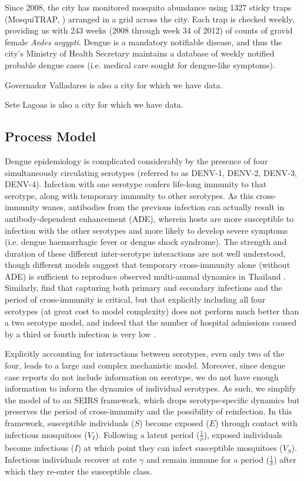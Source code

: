 \documentclass[10pt,letterpaper]{article}
\begin{document}
Since 2008, the city has monitored mosquito abundance using 1327 sticky traps (MosquiTRAP, \cite{Eiras2009}) arranged in a grid across the city.
Each trap is checked weekly, providing us with 243 weeks (2008 through week 34 of 2012) of counts of gravid female \emph{Aedes aegypti}.
Dengue is a mandatory notifiable disease, and thus the city's Ministry of Health Secretary maintains a database of weekly notified probable dengue cases (i.e. medical care sought for dengue-like symptoms).

Governador Valladares is also a city for which we have data.

Sete Lagoas is also a city for which we have data.


\subsection*{Process Model}

Dengue epidemiology is complicated considerably by the presence of four simultaneously circulating serotypes (referred to as DENV-1, DENV-2, DENV-3, DENV-4).
Infection with one serotype confers life-long immunity to that serotype, along with temporary immunity to other serotypes.  
As this cross-immunity wanes, antibodies from the previous infection can actually result in antibody-dependent enhancement (ADE), wherein hosts are more susceptible to infection with the other serotypes and more likely to develop severe symptoms (i.e. dengue haemorrhagic fever or dengue shock syndrome).
The strength and duration of these different inter-serotype interactions are not well understood, though different models suggest that temporary cross-immunity alone (without ADE) is sufficient to reproduce observed multi-annual dynamics in Thailand \cite{Wearing2006,Reich2013}.
Similarly, \cite{Aguiar2013} find that capturing both primary and secondary infections and the period of cross-immunity is critical, but that explicitly including all four serotypes (at great cost to model complexity) does not perform much better than a two serotype model, and indeed that the number of hospital admissions caused by a third or fourth infection is very low \cite{Aguiar2011a}.

Explicitly accounting for interactions between serotypes, even only two of the four, leads to a large and complex mechanistic model.
Moreover, since dengue case reports do not include information on serotype, we do not have enough information to inform the dynamics of individual serotypes.
As such, we simplify the model of \cite{Wearing2006} to an SEIRS framework, which drops serotype-specific dynamics but preserves the period of cross-immunity and the possibility of reinfection.
In this framework, susceptible individuals ($S$) become exposed ($E$) through contact with infectious mosquitoes ($V_I$).
Following a latent period ($\frac{1}{\rho}$), exposed individuals become infectious ($I$) at which point they can infect susceptible mosquitoes ($V_S$).
Infectious individuals recover at rate $\gamma$ and remain immune for a period ($\frac{1}{\delta}$) after which they re-enter the susceptible class.
\end{document}
